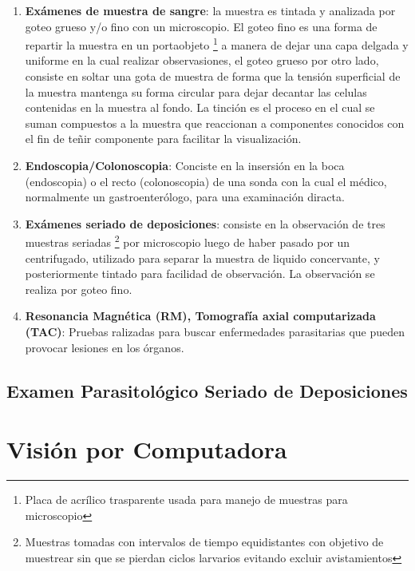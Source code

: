 \documentclass[letter,12pt]{report}
\begin{document}
\begin{enumerate}
    \item \textbf{Exámenes de muestra de sangre}: la muestra es tintada y analizada por
        goteo grueso y/o fino con un microscopio. El goteo fino es una forma de repartir
        la muestra en un portaobjeto \footnote{Placa de acrílico trasparente usada para
        manejo de muestras para microscopio} a manera de dejar una capa delgada y
        uniforme en la cual realizar observasiones, el goteo grueso por otro lado,
        consiste en soltar una gota de muestra de forma que la tensión superficial de la
        muestra mantenga su forma circular para dejar decantar las celulas contenidas en
        la muestra al fondo.  La tinción es el proceso en el cual se suman compuestos a
        la muestra que reaccionan a componentes conocidos con el fin de teñir componente
        para facilitar la visualización.
    \item \textbf{Endoscopia/Colonoscopia}: Conciste en la insersión en la boca
        (endoscopia) o el recto (colonoscopia) de una sonda con la cual el médico,
        normalmente un gastroenterólogo, para una examinación diracta.
    \item \textbf{Exámenes seriado de deposiciones}: consiste en la observación de tres
        muestras seriadas \footnote{Muestras tomadas con intervalos de tiempo
        equidistantes con objetivo de muestrear sin que se pierdan ciclos larvarios
        evitando excluir avistamientos} por microscopio luego de haber pasado por
        un centrifugado, utilizado para separar la muestra de liquido concervante, y
        posteriormente tintado para facilidad de observación. La observación se realiza por
        goteo fino.
    \item \textbf{Resonancia Magnética (RM), Tomografía axial computarizada (TAC)}:
        Pruebas ralizadas para buscar enfermedades parasitarias que pueden provocar
        lesiones en los órganos.
\end{enumerate}

\subsection{Examen Parasitológico Seriado de Deposiciones}
\blindtext

\section{Visión por Computadora}
\blindtext
\end{document}
